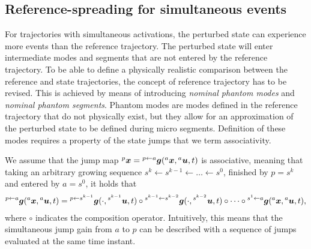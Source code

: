 \documentclass[../DC2019003Bouma.tex]{subfiles}
\begin{document}
\subsection{Reference-spreading for simultaneous events}
For trajectories with simultaneous activations, the perturbed state can experience more events than the reference trajectory. The perturbed state will enter intermediate modes and segments that are not entered by the reference trajectory. To be able to define a physically realistic comparison between the reference and state trajectories, the concept of reference trajectory has to be revised. This is achieved by means of introducing \textit{nominal phantom modes} and \textit{nominal phantom segments}. Phantom modes are modes defined in the reference trajectory that do not physically exist, but they allow for an approximation of the perturbed state to be defined during micro segments. Definition of these modes requires a property of the state jumps that we term associativity.

\begin{sloppypar}
\begin{myass}\label{ass:associativity}
We assume that the jump map $\hspace{0cm}^{p}{\boldsymbol{x}} = \hspace{0cm}^{p\leftarrow a}{\boldsymbol{g}}(\hspace{0cm}^{a}{\boldsymbol{x}},\hspace{0cm}^{a}{\boldsymbol{u}},t)$ is associative, meaning that taking an arbitrary growing sequence $s^k\leftarrow s^{k-1} \leftarrow \dots \leftarrow s^0$, finished by $p = s^k$ and entered by $a = s^0$, it holds that
\begin{align}
\hspace{0cm}^{p\leftarrow a}{\boldsymbol{g}}(\hspace{0cm}^{a}{\boldsymbol{x}},\hspace{0cm}^{a}{\boldsymbol{u}},t) = \hspace{0cm}^{p\leftarrow s^{k-1}}{\boldsymbol{g}}(\cdot,\hspace{0cm}^{s^{k-1}}{\boldsymbol{u}},t) \circ \hspace{0cm}^{s^{k-1} \leftarrow s^{k-2}}{\boldsymbol{g}}(\cdot,\hspace{0cm}^{s^{k-2}}{\boldsymbol{u}},t) \circ \cdots \circ \hspace{0cm}^{s^1 \leftarrow a}{\boldsymbol{g}}(\hspace{0cm}^{a}{\boldsymbol{x}},\hspace{0cm}^{a}{\boldsymbol{u}},t),
\end{align}
where $\circ$ indicates the composition operator. Intuitively, this means that the simultaneous jump gain from $a$ to $p$ can be described with a sequence of jumps evaluated at the same time instant.
\end{myass}
\end{sloppypar}
\end{document}
